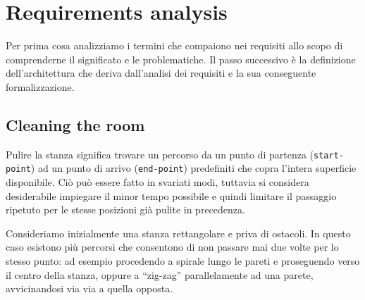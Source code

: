 \documentclass{../llncs}
\newcommand{\code}[1]{{\color{blue}\small{\texttt{#1}}}}
\newcommand{\labelsec}[1]{\label{sec:#1}}
\newcommand{\labelssec}[1]{\label{ssec:#1}}
\begin{document}
%

\section{Requirements analysis}
\labelsec{ReqAnalysis}
Per prima cosa analizziamo i termini che compaiono nei requisiti allo scopo di comprenderne il significato e le problematiche. Il passo successivo è la definizione dell'architettura che deriva dall'analisi dei requisiti e la sua conseguente formalizzazione.

\subsection{Cleaning the room}
\labelssec{cleaningRA}
Pulire la stanza significa trovare un percorso da un punto di partenza (\code{start-point}) ad un punto di arrivo (\code{end-point}) predefiniti che copra l'intera superficie disponibile. Ciò può essere fatto in svariati modi, tuttavia si considera desiderabile impiegare il minor tempo possibile e quindi limitare il passaggio ripetuto per le stesse posizioni già pulite in precedenza.

Consideriamo inizialmente una stanza rettangolare e priva di ostacoli. In questo caso esistono più percorsi che consentono di non passare mai due volte per lo stesso punto: ad esempio procedendo a spirale lungo le pareti e proseguendo verso il centro della stanza, oppure a ``zig-zag'' parallelamente ad una parete, avvicinandosi via via a quella opposta.
\end{document}
